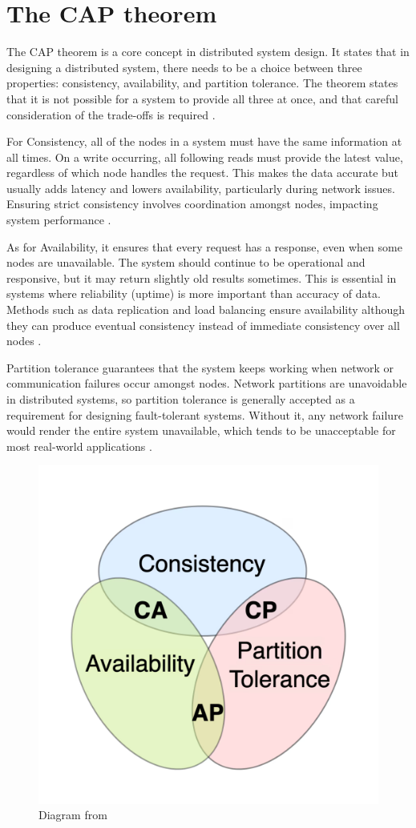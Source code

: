 \documentclass[]{final}
\begin{document}
\section{The CAP theorem}

The CAP theorem is a core concept in distributed system design. It states that
in designing a distributed system, there needs to be a choice between three
properties: consistency, availability, and partition tolerance. The theorem
states that it is not possible for a system to provide all three at once,
and that careful consideration of the trade-offs is required \cite{noauthor_cap_nodate}.

For Consistency, all of the nodes in a system must have the same information
at all times. On a write occurring, all following reads must provide the latest
value, regardless of which node handles the request. This makes the data
accurate but usually adds latency and lowers availability, particularly
during network issues. Ensuring strict consistency involves coordination
amongst nodes, impacting system performance \cite{noauthor_cap_nodate}.

As for Availability, it ensures that every request has a response, even when
some nodes are unavailable. The system should continue to be operational and
responsive, but it may return slightly old results sometimes. This is
essential in systems where reliability (uptime) is more important than
accuracy of data. Methods such as data replication and load balancing
ensure availability although they can produce eventual consistency instead
of immediate consistency over all nodes \cite{noauthor_cap_nodate}.

Partition tolerance guarantees that the system keeps working when network or
communication failures occur amongst nodes. Network partitions are unavoidable
in distributed systems, so partition tolerance is generally accepted as a
requirement for designing fault-tolerant systems. Without it, any network
failure would render the entire system unavailable, which tends to be
unacceptable for most real-world applications \cite{noauthor_cap_nodate}.

\begin{figure}[H]
  \centering
  \includegraphics[width=.3\linewidth]{CAPtheorem.png}
  \caption{Diagram from \cite{noauthor_cap_nodate}}
\end{figure}
\end{document}
